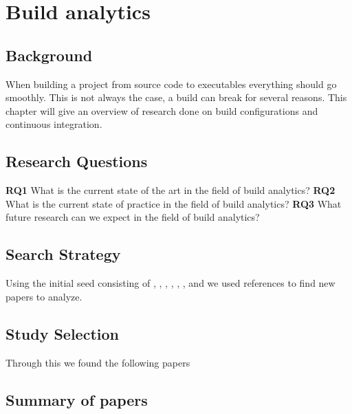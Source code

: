 \documentclass[]{book}
\begin{document}
\chapter{Build analytics}\label{build-analytics}

\section{Background}\label{background}

When building a project from source code to executables everything
should go smoothly. This is not always the case, a build can break for
several reasons. This chapter will give an overview of research done on
build configurations and continuous integration.

\section{Research Questions}\label{research-questions}

\textbf{RQ1} What is the current state of the art in the field of build
analytics? \textbf{RQ2} What is the current state of practice in the
field of build analytics? \textbf{RQ3} What future research can we
expect in the field of build analytics?

\section{Search Strategy}\label{search-strategy}

Using the initial seed consisting of \citet{bird2017predicting},
\citet{beller2017oops}, \citet{rausch2017empirical},
\citet{beller2017travistorrent}, \citet{pinto2018work},
\citet{zhao2017impact}, \citet{widder2018m} and \citet{hilton2016usage}
we used references to find new papers to analyze.

\section{Study Selection}\label{study-selection}

Through this we found the following papers

\section{Summary of papers}\label{summary-of-papers}

\subsection{\texorpdfstring{\citet{bird2017predicting}}{@bird2017predicting}}\label{bird2017predicting}
\end{document}
